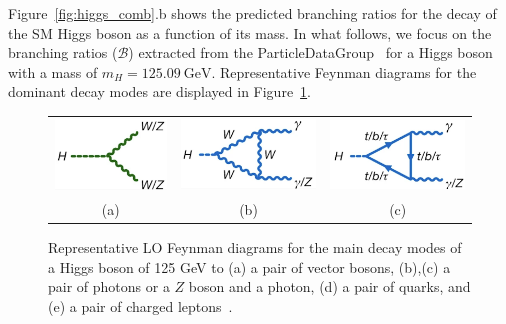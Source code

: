 Figure~\ref{fig:higgs_comb}.b shows the predicted branching ratios for the decay of the SM Higgs boson as a function of its mass. In what follows, we focus on the branching ratios (\(\mathcal{B}\)) extracted from the ParticleDataGroup~\cite{ParticleDataGroup} for a Higgs boson with a mass of \(m_H = 125.09~\mathrm{GeV}\). Representative Feynman diagrams for the dominant decay modes are displayed in Figure~\ref{fig:h_decays}.

\begin{figure}[htbp]
    \centering
    \begin{tabular}{ccc}
        \includegraphics[width=0.3\linewidth]{images/HVV.png}  &
        \includegraphics[width=0.3\linewidth]{images/Hgg.png}  &
        \includegraphics[width=0.3\linewidth]{images/Hgg_loop.png}   \\
        (a) & (b) & (c) \\
    \end{tabular}
    \vspace{0.5em} %
    \caption{
        Representative LO Feynman diagrams for the main decay modes of a Higgs boson of 125 GeV to (a) a pair of vector bosons, (b),(c) a pair of photons or a $Z$ boson and a photon,
        (d) a pair of quarks, and (e) a pair of charged leptons~\cite{Nature_ATLAS}.}
    \label{fig:h_decays}
\end{figure}
